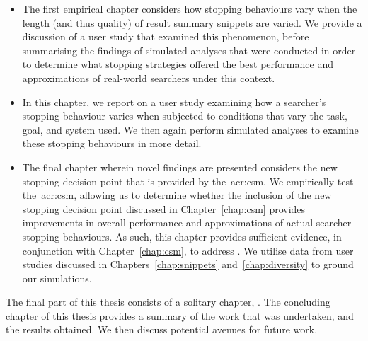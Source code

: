 \begin{itemize}
    \item[]{ The first empirical chapter considers how stopping behaviours vary when the length (and thus quality) of result summary snippets are varied. We provide a discussion of a user study that examined this phenomenon, before summarising the findings of simulated analyses that were conducted in order to determine what stopping strategies offered the best performance and approximations of real-world searchers under this context.}
    
    \item[]{ In this chapter, we report on a user study examining how a searcher's stopping behaviour varies when subjected to conditions that vary the task, goal, and system used. We then again perform simulated analyses to examine these stopping behaviours in more detail.}
    
    \item[]{ The final chapter wherein novel findings are presented considers the new stopping decision point that is provided by the~\gls{acr:csm}. We empirically test the~\gls{acr:csm}, allowing us to determine whether the inclusion of the new stopping decision point discussed in Chapter~\ref{chap:csm} provides improvements in overall performance and approximations of actual searcher stopping behaviours. As such, this chapter provides sufficient evidence, in conjunction with Chapter~\ref{chap:csm}, to address . We utilise data from user studies discussed in Chapters~\ref{chap:snippets} and~\ref{chap:diversity} to ground our simulations.}
\end{itemize}

\noindent
{} The final part of this thesis consists of a solitary chapter, . The concluding chapter of this thesis provides a summary of the work that was undertaken, and the results obtained. We then discuss potential avenues for future work.